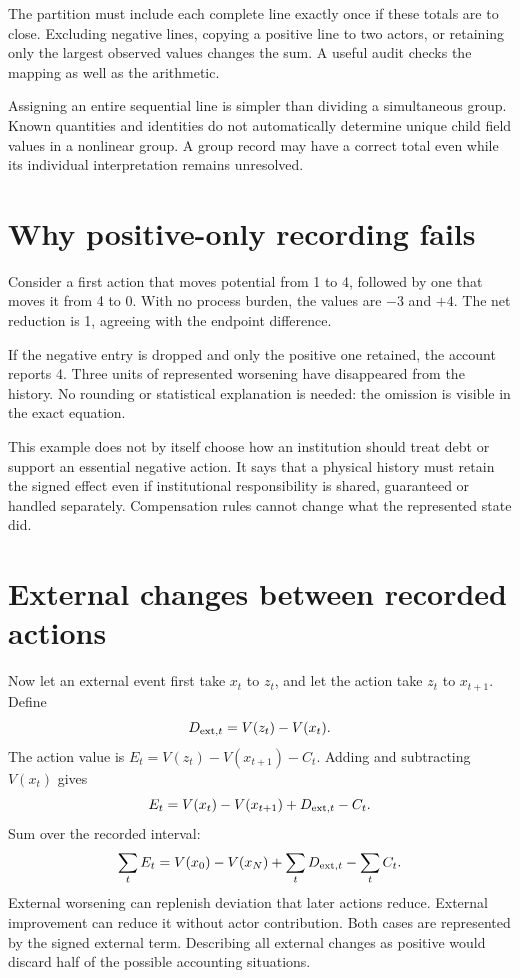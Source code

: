 The partition must include each complete line exactly once if these totals are to close. Excluding negative lines, copying a positive line to two actors, or retaining only the largest observed values changes the sum. A useful audit checks the mapping as well as the arithmetic.

Assigning an entire sequential line is simpler than dividing a simultaneous group. Known quantities and identities do not automatically determine unique child field values in a nonlinear group. A group record may have a correct total even while its individual interpretation remains unresolved.

\section{Why positive-only recording fails}
Consider a first action that moves potential from 1 to 4, followed by one that moves it from 4 to 0. With no process burden, the values are $-3$ and $+4$. The net reduction is 1, agreeing with the endpoint difference.

If the negative entry is dropped and only the positive one retained, the account reports 4. Three units of represented worsening have disappeared from the history. No rounding or statistical explanation is needed: the omission is visible in the exact equation.

This example does not by itself choose how an institution should treat debt or support an essential negative action. It says that a physical history must retain the signed effect even if institutional responsibility is shared, guaranteed or handled separately. Compensation rules cannot change what the represented state did.

\section{External changes between recorded actions}
Now let an external event first take $x_t$ to $z_t$, and let the action take $z_t$ to $x_{t+1}$. Define
\begin{equation}
 D_{{\rm ext},t}=V(z_t)-V(x_t).
\end{equation}
The action value is $E_t=V(z_t)-V(x_{t+1})-C_t$. Adding and subtracting $V(x_t)$ gives
\begin{equation}
 E_t=V(x_t)-V(x_{t+1})+D_{{\rm ext},t}-C_t.
\end{equation}
Sum over the recorded interval:
\begin{equation}\label{eq:driven-closure}
 \sum_tE_t=V(x_0)-V(x_N)+\sum_tD_{{\rm ext},t}-\sum_tC_t.
\end{equation}
External worsening can replenish deviation that later actions reduce. External improvement can reduce it without actor contribution. Both cases are represented by the signed external term. Describing all external changes as positive would discard half of the possible accounting situations.

